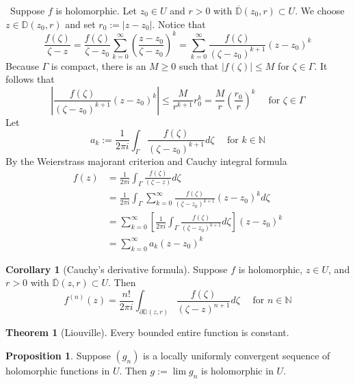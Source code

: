 \documentclass[12pt,a4paper]{book}
\newenvironment{prooff}{{\noindent\it\textcolor{cyan!40!black}{Proof}:}\,}{\par}
\theoremstyle{definition}
\newtheorem{coro}[defn]{Corollary}
\newtheorem{theo}[defn]{Theorem}
\newtheorem{prop}[defn]{Proposition}
\begin{document}
\begin{prooff}
    Suppose $f$ is holomorphic. Let $z_0 \in U$ and $r>0$ with $\overline{\mathbb{D}}\left(z_0, r\right) \subset U$. We choose $z \in \mathbb{D}\left(z_0, r\right)$ and set $r_0:=\left|z-z_0\right|$. 
    Notice that 
$$
\frac{f(\zeta)}{\zeta-z}=\frac{f(\zeta)}{\zeta-z_0} \sum_{k=0}^{\infty}\left(\frac{z-z_0}{\zeta-z_0}\right)^k=\sum_{k=0}^{\infty} \frac{f(\zeta)}{\left(\zeta-z_0\right)^{k+1}}\left(z-z_0\right)^k
$$
Because $\Gamma$ is compact, there is an $M \geq 0$ such that $|f(\zeta)| \leq M$ for $\zeta \in \Gamma$. It follows that
$$
\left|\frac{f(\zeta)}{\left(\zeta-z_0\right)^{k+1}}\left(z-z_0\right)^k\right| \leq \frac{M}{r^{k+1}} r_0^k=\frac{M}{r}\left(\frac{r_0}{r}\right)^k \quad \text { for } \zeta \in \Gamma
$$
Let 
$$
a_k:=\frac{1}{2 \pi i} \int_{\Gamma} \frac{f(\zeta)}{\left(\zeta-z_0\right)^{k+1}} d \zeta \quad \text { for } k \in \mathbb{N}
$$
By the Weierstrass majorant criterion and Cauchy integral formula
$$
\begin{aligned}
f(z) & =\frac{1}{2 \pi i} \int_{\Gamma} \frac{f(\zeta)}{(\zeta-z)} d \zeta \\
& =\frac{1}{2 \pi i} \int_{\Gamma} \sum_{k=0}^{\infty} \frac{f(\zeta)}{\left(\zeta-z_0\right)^{k+1}}\left(z-z_0\right)^k d \zeta \\
& =\sum_{k=0}^{\infty}\left[\frac{1}{2 \pi i} \int_{\Gamma} \frac{f(\zeta)}{\left(\zeta-z_0\right)^{k+1}} d \zeta\right]\left(z-z_0\right)^k \\
& =\sum_{k=0}^{\infty} a_k\left(z-z_0\right)^k
\end{aligned}
$$
\end{prooff}
\begin{coro}[Cauchy's derivative formula]
    Suppose $f$ is holomorphic, $z \in U$, and $r>0$ with $\overline{\mathbb{D}}(z, r) \subset U$. Then
    $$
    f^{(n)}(z)=\frac{n!}{2 \pi i} \int_{\partial \mathbb{D}(z, r)} \frac{f(\zeta)}{(\zeta-z)^{n+1}} d \zeta \quad \text { for } n \in \mathbb{N}
    $$
\end{coro}
\begin{theo}[Liouville]
    Every bounded entire function is constant.

\end{theo}
\begin{prop}
    Suppose $\left(g_n\right)$ is a locally uniformly 
    convergent sequence of holomorphic functions in $U$. Then $g:=\lim g_n$ is holomorphic in $U$.
\end{prop}
\end{document}
